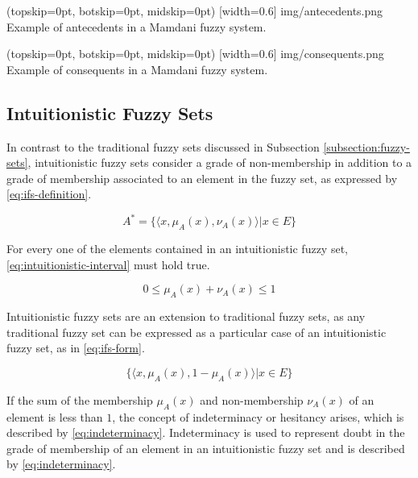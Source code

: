 \documentclass{ieeeaccess}
\begin{document}
\Figure[](topskip=0pt, botskip=0pt, midskip=0pt)
[width=0.6\linewidth]
{img/antecedents.png}
{Example of antecedents in a Mamdani fuzzy system.
  \label{figure:antecedents}}

\Figure[](topskip=0pt, botskip=0pt, midskip=0pt)
[width=0.6\linewidth]
{img/consequents.png}
{Example of consequents in a Mamdani fuzzy system.
  \label{figure:consequents}}

\subsection{Intuitionistic Fuzzy Sets}
\label{subsection:intuitionistic-fuzzy-sets}

In contrast to the traditional fuzzy sets discussed in Subsection
\ref{subsection:fuzzy-sets}, intuitionistic fuzzy sets consider a grade of
non-membership in addition to a grade of membership associated to an element in
the fuzzy set, as expressed by \ref{eq:ifs-definition}.

\begin{equation}
  \label{eq:ifs-definition}
  A^{*} = \{\langle x, \mu _{A} (x), \nu _{A} (x) \rangle | x \in E\}
\end{equation}

For every one of the elements contained in an intuitionistic fuzzy set, 
\ref{eq:intuitionistic-interval} must hold true.

\begin{equation}
  \label{eq:intuitionistic-interval}
  0 \leq \mu_{A}(x) + \nu_{A}(x) \leq 1
\end{equation}

Intuitionistic fuzzy sets are an extension to traditional fuzzy sets, as any
traditional fuzzy set can be expressed as a particular case of an intuitionistic
fuzzy set, as in \ref{eq:ifs-form}.

\begin{equation}
  \label{eq:ifs-form}
  \{ \langle x, \mu_{A}(x), 1 - \mu_{A}(x) \rangle | x \in E \}
\end{equation}

If the sum of the membership $\mu_{A}(x)$ and non-membership $\nu_{A}(x)$ of an
element is less than $1$, the concept of indeterminacy or hesitancy arises,
which is described by \ref{eq:indeterminacy}. Indeterminacy is used to represent
doubt in the grade of membership of an element in an intuitionistic fuzzy set
and is described by \ref{eq:indeterminacy}.
\end{document}
